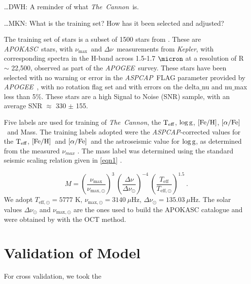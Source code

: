 \documentclass[12pt, preprint]{aastex}
\newcommand{\project}[1]{\textsl{#1}}
\newcommand{\thecannon}{\project{The~Cannon}}
\newcommand{\tc}{\project{The~Cannon}}
\newcommand{\apogee}{\project{APOGEE}}
\newcommand{\apokasc}{\project{APOKASC}}
\newcommand{\aspcap}{\project{ASPCAP}}
\newcommand{\kepler}{\project{Kepler}}
\newcommand{\teff}{\mbox{$\rm T_{eff}$}}
\newcommand{\feh}{\mbox{$\rm [Fe/H]$}}
\newcommand{\alphafe}{\mbox{$\rm [\alpha/Fe]$}}
\newcommand{\logg}{\mbox{$\rm \log g$}}
\newcommand{\numax}{$\nu_{\max}$}
\newcommand{\deltanu}{$\Delta\nu$}
\begin{document}
\ldots DWH: A reminder of what \thecannon\ is.

\ldots MKN: What is the training set?  How has it been selected and adjusted?

The training set of stars is a subset of 1500 stars from \citet{Martig2015}. These are \apokasc\ stars, with \numax\ and \deltanu\ measurements from \kepler, with corresponding spectra in the H-band across 1.5-1.7 $\micron$ at a resolution of R $\sim$ 22,500, observed as part of the \apogee\ survey. These stars have been selected with no warning or error in the \aspcap\ FLAG parameter provided by \apogee\ \citep{Ahn2014}, with no rotation flag set and with errors on the delta$\_$nu and nu$\_$max less than 5\%. These stars are a high Signal to Noise (SNR) sample, with an average SNR $\approx$ 330 $\pm$ 155. 

Five labels are used for training of \tc, the \teff, \logg, \feh, \alphafe\ and Mass. The training labels adopted were the \aspcap-corrected \citep{Meszaros2013} values for the \teff, \feh\ and \alphafe\ and the astroseismic value for \logg, as determined from the measured $\nu_{max}$ . The mass label was determined using the standard seismic scaling relation given in \ref{eqn1} \citep{SilvaAguirre2011,Chaplin2011}.

\begin{equation} \label{eq:mass}
M= \left( \frac{\nu_{\mathrm{max}}}{\nu_{\mathrm{max,\odot}}}\right)^3\  \left( \frac{\Delta \nu}{\Delta \nu_{\odot}}\right)^{-4} \ \left( \frac{T_{\mathrm{eff}}}{T_{\mathrm{eff,\odot}}}\right)^{1.5} \ .
\label{eq1}
\end{equation}
We adopt  $T_{\mathrm{eff,\odot}}=5777$ K, $\nu_{\mathrm{max,\odot}}=3140\ \mu$Hz, $\Delta \nu_{\odot}=135.03\ \mu$Hz. The solar values  $\Delta \nu_{\odot}$ and $\nu_{\mathrm{max,\odot}}$ are the ones used to build the APOKASC catalogue and were obtained by \cite{Hekker2013} with the OCT method. 

\section{Validation of Model}

For cross validation, we took the 



\end{document}
